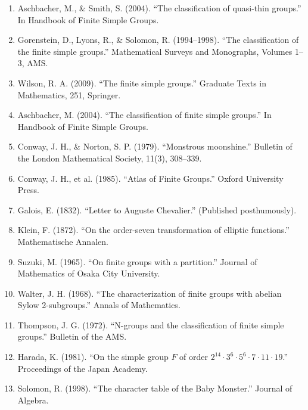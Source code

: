 \begin{enumerate}
\item Aschbacher, M., \& Smith, S. (2004). ``The classification of quasi-thin groups.'' In Handbook of Finite Simple Groups.
\item Gorenstein, D., Lyons, R., \& Solomon, R. (1994--1998). ``The classification of the finite simple groups.'' Mathematical Surveys and Monographs, Volumes 1--3, AMS.
\item Wilson, R. A. (2009). ``The finite simple groups.'' Graduate Texts in Mathematics, 251, Springer.
\item Aschbacher, M. (2004). ``The classification of finite simple groups.'' In Handbook of Finite Simple Groups.
\item Conway, J. H., \& Norton, S. P. (1979). ``Monstrous moonshine.'' Bulletin of the London Mathematical Society, 11(3), 308--339.
\item Conway, J. H., et al. (1985). ``Atlas of Finite Groups.'' Oxford University Press.
\item Galois, E. (1832). ``Letter to Auguste Chevalier.'' (Published posthumously).
\item Klein, F. (1872). ``On the order-seven transformation of elliptic functions.'' Mathematische Annalen.
\item Suzuki, M. (1965). ``On finite groups with a partition.'' Journal of Mathematics of Osaka City University.
\item Walter, J. H. (1968). ``The characterization of finite groups with abelian Sylow 2-subgroups.'' Annals of Mathematics.
\item Thompson, J. G. (1972). ``N-groups and the classification of finite simple groups.'' Bulletin of the AMS.
\item Harada, K. (1981). ``On the simple group $F$ of order $2^{14} \cdot 3^6 \cdot 5^6 \cdot 7 \cdot 11 \cdot 19$.'' Proceedings of the Japan Academy.
\item Solomon, R. (1998). ``The character table of the Baby Monster.'' Journal of Algebra.
\end{enumerate}